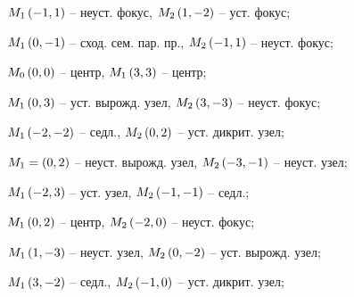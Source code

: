 \begin{enumsols}
		\label{sol:stability_points:types_poly2}
		\item \( M_1 \left( -1, 1 \right) \) -- неуст. фокус, \( M_2 \left( 1, -2 \right) \) -- уст. фокус; %
		\item \( M_1 \left( 0, -1 \right) \) -- сход. сем. пар. пр., \( M_2 \left( -1, 1 \right) \) -- неуст. фокус; %
		\item \( M_0 \left( 0, 0 \right) \) -- центр, \( M_1 \left( 3, 3 \right) \) -- центр; %
		\item \( M_1 \left( 0, 3 \right) \) -- уст. вырожд. узел, \( M_2 \left( 3, -3 \right) \) -- неуст. фокус; %
		\item \( M_1 \left( -2, -2 \right) \) -- седл., \( M_2 \left( 0, 2 \right) \) -- уст. дикрит. узел; %
		\item \( M_1 = \left( 0, 2 \right) \) -- неуст. вырожд. узел, \( M_2 \left( -3, -1 \right) \) -- неуст. узел; %
		
		\label{sol:stability_points:types_poly_hard}
		\item \( M_1 \left( -2, 3 \right) \) -- уст. узел, \( M_2 \left( -1, -1 \right) \) -- седл.; %
		\item \( M_1 \left( 0, 2 \right) \) -- центр, \( M_2 \left( -2, 0 \right) \) -- неуст. фокус; %
		\item \( M_1 \left( 1, -3 \right) \) -- неуст. узел, \( M_2 \left( 0, -2 \right) \) -- уст. вырожд. узел; %
		\item \( M_1 \left( 3, -2 \right) \) -- седл., \( M_2 \left( -1, 0 \right) \) -- уст. дикрит. узел; %


\end{enumsols}
